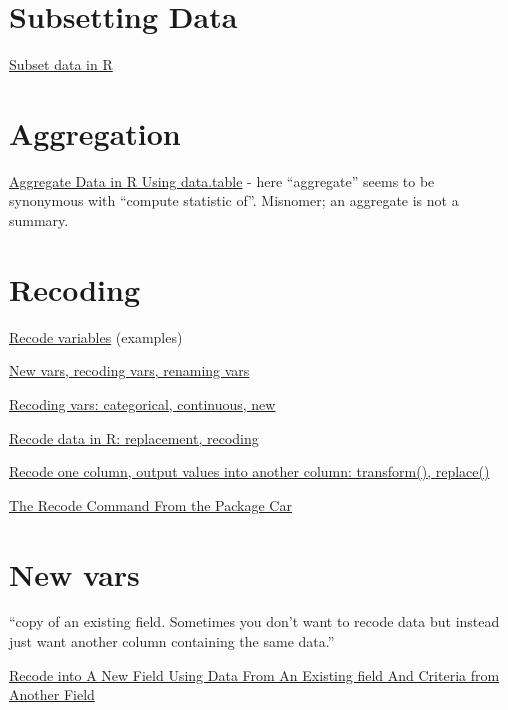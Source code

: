 \documentclass[reqno,12pt]{tufte-book}
\numberwithin{equation}{subsection}
\begin{document}
\section{Subsetting Data}
\label{sect:datasubsetting}

\href{http://rprogramming.net/subset-data-in-r/}{Subset data in R}

\section{Aggregation}
\label{sect:dataaggregate}

\href{http://rprogramming.net/aggregate-data-in-r-using-data-table/}{Aggregate
  Data in R Using data.table} - here ``aggregate'' seems to be
synonymous with ``compute statistic of''.  Misnomer; an aggregate is not a summary.

\section{Recoding}
\label{sect:recodingr}

\href{http://www.uni-kiel.de/psychologie/rexrepos/posts/recode.html}{Recode variables} (examples)

\href{http://www.statmethods.net/management/variables.html}{New vars, recoding vars, renaming vars}

\href{http://www.cookbook-r.com/Manipulating\_data/Recoding\_data/}{Recoding vars: categorical, continuous, new}

\href{http://rprogramming.net/recode-data-in-r/}{Recode data in R: replacement, recoding}

\href{http://rwiki.sciviews.org/doku.php?id=tips:data-frames:recode_column}{Recode one column, output values into another column: transform(), replace()}

\href{http://rprogramming.net/recode-data-in-r/}{The Recode Command From the Package Car}

\section{New vars}
\label{sect:newvars}

``copy of an existing field. Sometimes you don’t want to recode data but instead just want another column containing the same data.''

\href{http://rprogramming.net/recode-data-in-r/}{Recode into A New Field Using Data From An Existing field And Criteria from Another Field}
\end{document}
